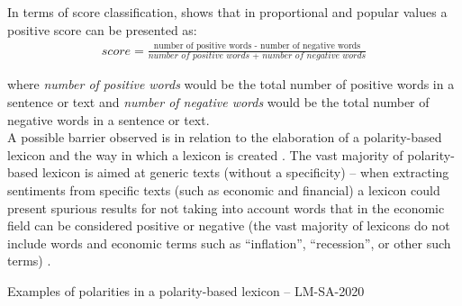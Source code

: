 In terms of score classification, \cite{BCDG07} shows that in proportional and popular values a positive score can be presented as:
\begin{align*}
score = \frac{\text{number of positive words - number of negative words}}{\textit{number of positive words + number of negative words}}
\end{align*}

where \textit{number of positive words} would be the total number of positive words in a sentence or text and \textit{number of negative words} would be the total number of negative words in a sentence or text.\\

A possible barrier observed is in relation to the elaboration of a polarity-based lexicon and the way in which a lexicon is created \cite[]{stone1966general}. The vast majority of polarity-based lexicon is aimed at generic texts (without a specificity) -- when extracting sentiments from specific texts (such as economic and financial) a lexicon could present spurious results for not taking into account words that in the economic field can be considered positive or negative (the vast majority of lexicons do not include words and economic terms such as ``inflation'', ``recession'', or other such terms) \cite[]{loughran2011liability}.\\

\begin{table}[!h]
\caption{Examples of polarities in a polarity-based lexicon -- LM-SA-2020}
\caption*{Source: Words and polarities taken from \cite[]{lmdata}}
\label{tab:polarity}
\end{table}

